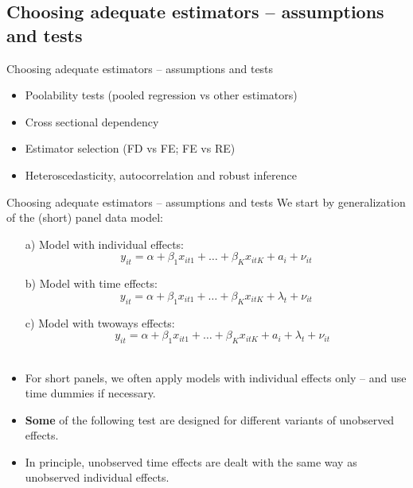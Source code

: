 \documentclass[usenames,dvipsnames]{beamer}
\begin{document}
\subsection*{Choosing adequate estimators -- assumptions and tests}
\begin{frame}{Choosing adequate estimators -- assumptions and tests}
\begin{itemize}
    \item Poolability tests (pooled regression vs other estimators)
    \medskip
    \item Cross sectional dependency
    \medskip
    \item Estimator selection (FD vs FE;  FE vs RE)
    \medskip 
    \item Heteroscedasticity, autocorrelation and robust inference
\end{itemize}
\end{frame}
\begin{frame}{Choosing adequate estimators -- assumptions and tests}
We start by generalization of the (short) panel data model:
\begin{itemize}
   \medskip
    \item[a)] Model with individual effects: 
    $$y_{it} = \alpha + \beta_{1} x_{it1} + \dots + \beta_K x_{itK} + a_i + \nu_{it}$$
    \item[b)] Model with time effects: 
    $$y_{it} = \alpha + \beta_{1} x_{it1} + \dots + \beta_K x_{itK} + \lambda_t + \nu_{it}$$  
    \item[c)] Model with twoways effects: 
    $$~~~~~y_{it} = \alpha + \beta_{1} x_{it1} + \dots + \beta_K x_{itK} + a_i + \lambda_t + \nu_{it}$$\\ \medskip
    \item For short panels, we often apply models with individual effects only -- and use time dummies if necessary.
    \item \textbf{Some} of the following test are designed for different variants of unobserved effects.
    \item In principle, unobserved time effects are dealt with the same way as unobserved individual effects.
\end{itemize}
\end{frame}
\end{document}
